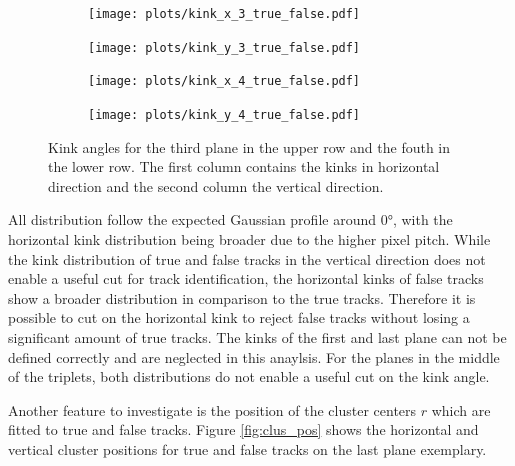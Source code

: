 \begin{figure}
  \hspace{-2.5cm}
  \begin{subfigure}{0.62\textwidth}
      \texttt{[image: plots/kink\_x\_3\_true\_false.pdf]}
  \end{subfigure}
  \begin{subfigure}{0.62\textwidth}
      \hspace{0.95cm}
      \texttt{[image: plots/kink\_y\_3\_true\_false.pdf]}
  \end{subfigure}
  \begin{subfigure}{0.62\textwidth}
    \hspace{-2.5cm}
      \texttt{[image: plots/kink\_x\_4\_true\_false.pdf]}
  \end{subfigure}
  \begin{subfigure}{0.62\textwidth}
    \hspace{-2.5cm}
      \hspace{0.95cm}
      \texttt{[image: plots/kink\_y\_4\_true\_false.pdf]}
  \end{subfigure}
  \caption{Kink angles for the third plane in the upper row and the fouth in the lower row. The first column contains the kinks in horizontal direction and the second column
  the vertical direction.}
  \label{fig:kinks}
\end{figure}

All distribution follow the expected Gaussian profile around 0°, with the horizontal kink distribution being broader due to the higher pixel pitch.
While the kink distribution of true and false tracks in the vertical direction does not enable a useful
cut for track identification, the horizontal kinks of false tracks show a broader distribution in comparison to the true tracks. Therefore it is
possible to cut on the horizontal kink to reject false tracks without losing a significant amount of true tracks.
The kinks of the first and last plane can not be defined correctly and are neglected in this anaylsis. For the planes in the middle of the triplets, both
distributions do not enable a useful cut on the kink angle.

Another feature to investigate is the position of the cluster centers $r$ which are fitted to true and false tracks. Figure \ref{fig:clus_pos} shows the
horizontal and vertical cluster positions for true and false tracks on the last plane exemplary.

